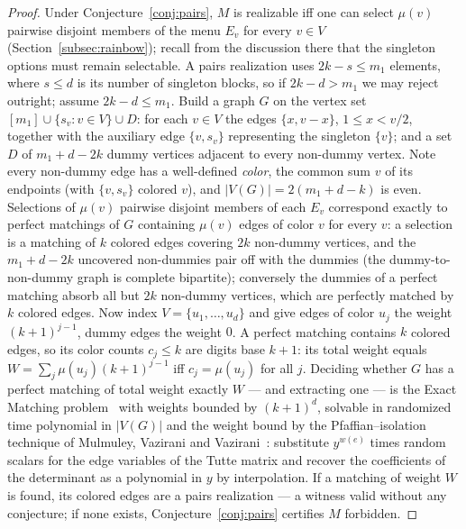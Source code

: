 \documentclass[11pt]{article}
\theoremstyle{definition}
\theoremstyle{remark}
\newcommand{\intv}[1]{[#1]}
\begin{document}
\begin{proof}
Under Conjecture~\ref{conj:pairs}, $M$ is realizable iff one can select $\mu(v)$
pairwise disjoint members of the menu $E_v$ for every $v\in V$
(Section~\ref{subsec:rainbow}); recall from the discussion there that the
singleton options must remain selectable. A pairs realization uses
$2k-s\le m_1$ elements, where $s\le d$ is its number of singleton blocks, so if
$2k-d>m_1$ we may reject outright; assume $2k-d\le m_1$. Build a graph $G$ on the
vertex set $\intv{m_1}\cup\{s_v:v\in V\}\cup D$: for each $v\in V$ the edges
$\{x,v-x\}$, $1\le x<v/2$, together with the auxiliary edge $\{v,s_v\}$
representing the singleton $\{v\}$; and a set $D$ of $m_1+d-2k$ dummy vertices
adjacent to every non-dummy vertex. Note every non-dummy edge has a well-defined
\emph{color}, the common sum $v$ of its endpoints (with $\{v,s_v\}$ colored $v$),
and $|V(G)|=2(m_1+d-k)$ is even. Selections of $\mu(v)$ pairwise disjoint members
of each $E_v$ correspond exactly to perfect matchings of $G$ containing $\mu(v)$
edges of color $v$ for every $v$: a selection is a matching of $k$ colored edges
covering $2k$ non-dummy vertices, and the $m_1+d-2k$ uncovered non-dummies pair
off with the dummies (the dummy-to-non-dummy graph is complete bipartite);
conversely the dummies of a perfect matching absorb all but $2k$ non-dummy
vertices, which are perfectly matched by $k$ colored edges. Now index
$V=\{u_1,\dots,u_d\}$ and give edges of color $u_j$ the weight $(k+1)^{j-1}$,
dummy edges the weight $0$. A perfect matching contains $k$ colored edges, so its
color counts $c_j\le k$ are digits base $k+1$: its total weight equals
$W=\sum_j\mu(u_j)(k+1)^{j-1}$ iff $c_j=\mu(u_j)$ for all $j$. Deciding whether
$G$ has a perfect matching of total weight exactly $W$ --- and extracting one ---
is the Exact Matching problem~\cite{PapadimitriouYannakakis82} with weights
bounded by $(k+1)^{d}$, solvable in randomized time polynomial in $|V(G)|$ and
the weight bound by the Pfaffian--isolation technique of Mulmuley, Vazirani and
Vazirani~\cite{MulmuleyVaziraniVazirani87}: substitute $y^{w(e)}$ times random
scalars for the edge variables of the Tutte matrix and recover the coefficients
of the determinant as a polynomial in $y$ by interpolation. If a matching of
weight $W$ is found, its colored edges are a pairs realization --- a witness valid
without any conjecture; if none exists, Conjecture~\ref{conj:pairs} certifies $M$
forbidden.
\end{proof}
\end{document}

